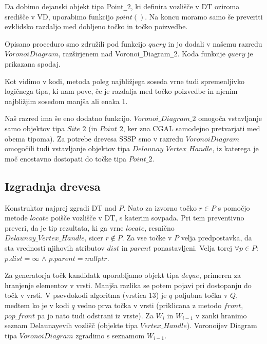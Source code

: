 \documentclass[a4paper, 12pt]{book}
\begin{document}
Da dobimo dejanski objekt tipa Point\texttt{\_}2, ki definira vozlišče v DT oziroma središče v VD, uporabimo funkcijo $point()$. Na koncu moramo samo še preveriti evklidsko razdaljo med dobljeno točko in točko poizvedbe.

Opisano proceduro smo združili pod funkcijo $query$ in jo dodali v našemu razredu $VoronoiDiagram$, razširjenem nad Voronoi\texttt{\_}Diagram\texttt{\_}2. Koda funkcije $query$ je prikazana spodaj.



Kot vidimo v kodi, metoda poleg najbližjega soseda vrne tudi spremenljivko logičnega tipa, ki nam pove, če je razdalja med točko poizvedbe in njenim najbližjim sosedom manjša ali enaka 1. 

Naš razred ima še eno dodatno funkcijo. $Voronoi\texttt{\_}Diagram\texttt{\_}2$ omogoča vstavljanje samo objektov tipa $Site\texttt{\_}2$ (in $Point\texttt{\_}2$, ker zna CGAL samodejno pretvarjati med obema tipoma). Za potrebe drevesa SSSP smo v razredu $VoronoiDiagram$ omogočili tudi vstavljanje objektov tipa $Delaunay\texttt{\_}Vertex\texttt{\_}Handle$, iz katerega je moč enostavno dostopati do točke tipa $Point\texttt{\_}2$.
\subsection{Izgradnja drevesa} 

Konstruktor najprej zgradi DT nad $P$. Nato za izvorno točko $r\in P$ s pomočjo metode $locate$ poišče vozlišče v DT, s katerim sovpada. Pri tem preventivno preveri, da je tip rezultata, ki ga vrne $locate$, resnično \\ 
$Delaunay\texttt{\_}Vertex\texttt{\_}Handle$, sicer $r\notin P$. Za vse točke v $P$ velja predpostavka, da sta vrednosti njihovih atributov $dist$ in $parent$ ponastavljeni. Velja torej $\forall p\in P:$ $p.dist = \infty$ $\wedge$ $p.parent = nullptr$. 

Za generatorja točk kandidatk uporabljamo objekt tipa $deque$, primeren za hranjenje elementov v vrsti. Manjša razlika se potem pojavi pri dostopanju do točk v vrsti. V psevdokodi algoritma (vrstica 13) je $q$ poljubna točka v $Q$, medtem ko je v kodi $q$ vedno prva točka v vrsti (priklicana z metodo $front$, $pop\texttt{\_}front$ pa jo nato tudi odstrani iz vrste). Za $W_i$ in $W_{i-1}$ v zanki hranimo seznam Delaunayevih vozlišč (objekte tipa $Vertex\texttt{\_}Handle$). Voronoijev Diagram tipa $VoronoiDiagram$ zgradimo s seznamom $W_{i-1}$.
\end{document}

